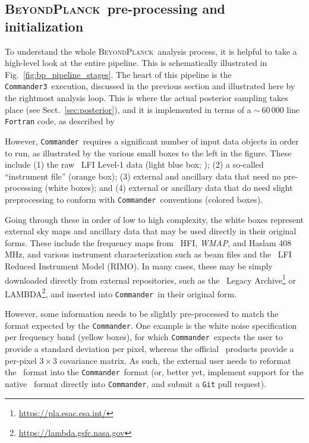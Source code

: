 \documentclass[twocolumn]{aa}
\def\WMAP{\textit{WMAP}}
\def\commander{\texttt{Commander}}
\def\commanderthree{\texttt{Commander3}}
\newcommand{\BP}{\textsc{BeyondPlanck}}
\begin{document}
\subsection{\BP\ pre-processing and initialization}
\label{sec:pipeline}

To understand the whole \BP\ analysis process, it is helpful to take a high-level look at the entire pipeline. This is schematically illustrated in Fig.~\ref{fig:bp_pipeline_stages}. The heart of this pipeline is the \commanderthree\ execution, discussed in the previous section and illustrated here by the rightmost analysis loop. This is where the actual posterior sampling takes place (see Sect.~\ref{sec:posterior}), and it is implemented in terms of a $\sim$\,60\,000 line \texttt{Fortran} code, as described by \citet{BP03}

However, \commander\ requires a significant number of input data objects in order to run, as illustrated by the various small boxes to the left in the figure. These include (1) the raw \Planck\ LFI Level-1 data (light blue box; \citealp{planck2016-l02}); (2) a so-called ``instrument file'' (orange box); (3) external and ancillary data that need no pre-processing (white boxes); and (4) external or ancillary data that do need slight preprocessing to conform with \commander\ conventions (colored boxes).

Going through these in order of low to high complexity, the white boxes represent external sky maps and ancillary data that may be used directly in their original forms. These include the frequency maps from \Planck\ HFI, \WMAP, and Haslam 408\,MHz, and various instrument characterization such as beam files and the \Planck\ LFI Reduced Instrument Model (RIMO). In many cases, these may be simply downloaded directly from external repositories, such as the \Planck\ Legacy Archive\footnote{\url{https://pla.esac.esa.int/}} or LAMBDA\footnote{\url{https://lambda.gsfc.nasa.gov}}, and inserted into \commander\ in their original form.

However, some information needs to be slightly pre-processed to match the format expected by the \commander. One example is the white noise specification per frequency band (yellow boxes), for which \commander\ expects the user to provide a standard deviation per pixel, whereas the official \Planck\ products provide a per-pixel $3\times 3$ covariance matrix. As such, the external user needs to reformat the \Planck\ format into the \commander\ format (or, better yet, implement support for the native \Planck\ format directly into \commander, and submit a \texttt{Git} pull request).
\end{document}
